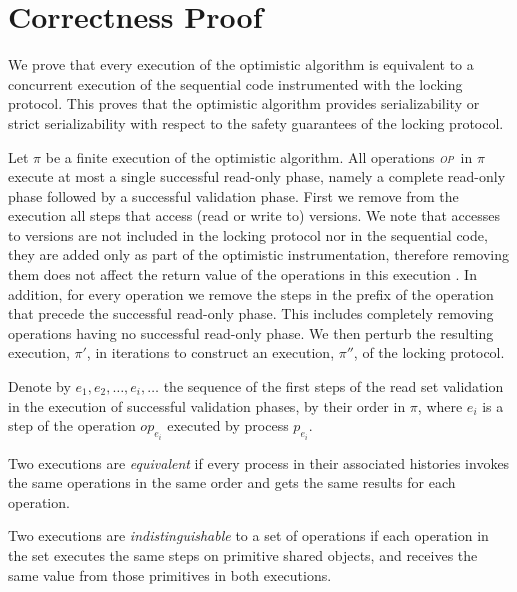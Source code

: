 \newcommand{\op}{\emph{\textsc{op}}}
\newcommand{\opt}{\textsc{opt}}

\section{Correctness Proof}
\label{sec:proof}

We prove that every execution of the optimistic algorithm is equivalent to a
concurrent execution of the sequential code instrumented with the locking
protocol. 
This proves that the optimistic algorithm provides serializability or strict
serializability with respect to the safety guarantees of the locking protocol.

Let $\pi$ be a finite execution of the optimistic algorithm. All
operations \op\ in $\pi$ execute at most a single successful read-only
phase, namely a complete read-only phase followed by a successful validation
phase.
First we remove
from the execution all steps that access (read or write to) versions. 
We note that accesses to versions are not included in the locking protocol 
nor in the sequential code, they are added only as part of the
optimistic instrumentation, therefore removing them does not affect the return
value of the operations in this execution . In addition, for every operation we remove the steps in the prefix
of the operation that precede the successful read-only phase. 
This includes completely removing operations having no successful read-only
phase. 
We then perturb the
resulting execution, $\pi'$, in iterations to construct an execution, $\pi''$, of the locking protocol.

Denote by $e_1, e_2, \ldots, e_i, \ldots$ the sequence of the first steps of the
read set validation in the execution of successful validation phases, by their
order in $\pi$, where $e_i$ is a step of the operation $op_{e_i}$ executed by process $p_{e_i}$.

Two executions are \emph{equivalent} if every process in their associated
histories invokes the same operations in the same order and gets the
same results for each operation. 

Two executions are \emph{indistinguishable} to a set of operations if each
operation in the set executes the same steps on primitive shared objects, and
receives the same value from those primitives in both executions.


